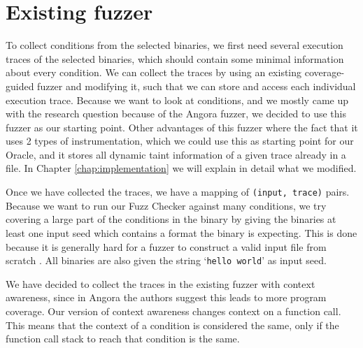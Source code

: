 \section{Existing fuzzer}
To collect conditions from the selected binaries, we first need several execution traces of the selected binaries, which should contain some minimal information about every condition. We can collect the traces by using an existing coverage-guided fuzzer and modifying it, such that we can store and access each individual execution trace.
Because we want to look at conditions, and we mostly came up with the research question because of the Angora fuzzer, we decided to use this fuzzer as our starting point. Other advantages of this fuzzer where the fact that it uses 2 types of instrumentation, which we could use this as starting point for our Oracle, and it stores all dynamic taint information of a given trace already in a file. 
In Chapter \ref{chap:implementation} we will explain in detail what we modified.



Once we have collected the traces, we have a mapping of \texttt{(input, trace)} pairs. Because we want to run our Fuzz Checker against many conditions, we try covering a large part of the conditions in the binary by giving the binaries at least one input seed which contains a format the binary is expecting. This is done because it is generally hard for a fuzzer to construct a valid input file from scratch \cite{you2019slf}.
All binaries are also given the string `\texttt{hello world}' as input seed.

We have decided to collect the traces in the existing fuzzer with context awareness, since in Angora \cite{chen2018angora} the authors suggest this leads to more program coverage. Our version of context awareness changes context on a function call. This means that the context of a condition is considered the same, only if the function call stack to reach that condition is the same.

